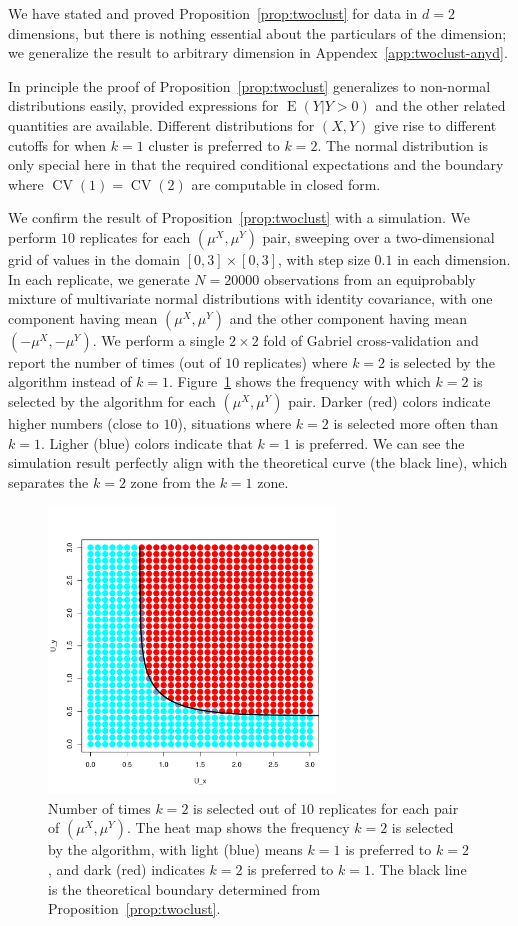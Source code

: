 \documentclass[12pt]{article}
\newcommand{\CV}{\operatorname{CV}}
\newcommand{\E}{\operatorname{E}}
\newcommand{\muX}{\mu^{X}}
\newcommand{\muY}{\mu^{Y}}
\begin{document}
We have stated and proved Proposition~\ref{prop:twoclust} for data in $d = 2$
dimensions, but there is nothing essential about the particulars of the
dimension; we generalize the result to arbitrary dimension in
Appendex~\ref{app:twoclust-anyd}.


In principle the proof of Proposition~\ref{prop:twoclust} generalizes to
non-normal distributions easily, provided expressions for $\E(Y | Y > 0)$ and
the other related quantities are available. Different distributions for
$(X,Y)$ give rise to different cutoffs for when $k = 1$ cluster is preferred
to $k = 2$. The normal distribution is only special here in that the required
conditional expectations and the boundary where $\CV(1) = \CV(2)$ are
computable in closed form. 



We confirm the result of Proposition~\ref{prop:twoclust} with a simulation.
We perform $10$ replicates for each $(\mu^X, \mu^Y)$ pair, sweeping over
a two-dimensional grid of values in the domain $[0,3] \times [0,3]$, with step
size $0.1$ in each dimension.  In each
replicate, we generate $N=20000$ observations from an equiprobably mixture
of multivariate normal distributions with identity covariance, with one
component having mean $(\muX, \muY)$ and
the other component having mean $(-\muX, -\muY)$. We perform a single $2 \times 2$
fold of Gabriel cross-validation and report the number of times
(out of $10$ replicates) where $k=2$ is selected by the algorithm instead of $k=1$.
Figure~\ref{fig:overlap-color_plot} shows the frequency with which $k=2$ is selected by
the algorithm for each $(\mu^X, \mu^Y)$ pair. Darker (red) colors indicate
higher numbers (close to $10$), situations where $k = 2$ is selected more
often than $k = 1$. Ligher (blue) colors indicate that $k = 1$ is preferred.
We can see the simulation result perfectly align with the
theoretical curve (the black line), which separates the $k=2$ zone from the
$k=1$ zone.

\begin{figure}
\centering
\includegraphics[width=3in]{demo/overlap/color_plot.pdf}
\caption{Number of times $k=2$ is selected out of $10$ replicates for each
pair of $(\muX, \muY)$. The heat map shows the frequency $k=2$ is selected by
the algorithm, with light (blue) means $k = 1$ is preferred to $k = 2$, and
dark (red) indicates $k = 2$ is preferred to $k = 1$.
The black line is the theoretical boundary determined from
Proposition~\ref{prop:twoclust}.}
\label{fig:overlap-color_plot}
\end{figure}
\end{document}
